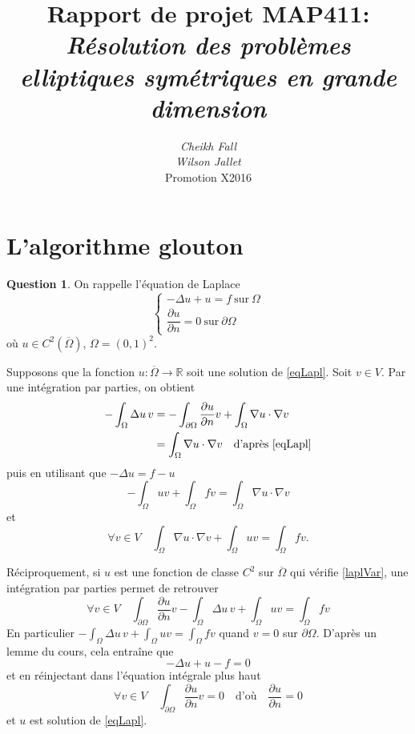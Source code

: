 \documentclass[11pt]{article}
\title{
	\textbf{Rapport de projet MAP411}:\\
	\textit{Résolution des problèmes elliptiques symétriques en grande dimension}}
\author{
	\textit{Cheikh Fall}\\
	\textit{Wilson Jallet}\\
Promotion X2016}
\newcommand{\RR}{\mathbb{R}}
\theoremstyle{definition}
\newtheorem{ques}{Question}
\begin{document}
\maketitle

\section{L'algorithme glouton}

\setlength{\parindent}{1cm}
\setlength{\parskip}{3mm}

\begin{ques}
On rappelle l'équation de Laplace
\begin{equation}\label{eqLapl}
\left\{
\begin{array}{c}
-\Delta u + u = f\ \text{sur}\ \Omega \\
\dfrac{\partial u}{\partial n} = 0\ \text{sur}\ \partial\Omega
\end{array}
\right.
\end{equation}
où $u \in C^2(\overline{\Omega})$, $\Omega = (0,1)^2$.

Supposons que la fonction $u:\overline\Omega\longrightarrow\RR$ soit une solution de \eqref{eqLapl}. Soit $v\in V$. Par une intégration par parties, on obtient
\begin{align*}
-\int_\Omega \Delta u\, v &= -\int_{\partial\Omega} \frac{\partial u}{\partial n}v + \int_\Omega \nabla u\cdot \nabla v \\
&= \int_\Omega \nabla u\cdot \nabla v \quad \text{d'après \eqref{eqLapl}}
\end{align*}
puis en utilisant que $-\Delta u = f-u$
\[
	-\int_\Omega uv + \int_\Omega fv = \int_\Omega \nabla u\cdot \nabla v
\]
et
\begin{equation}\label{laplVar}
\forall v\in V\quad
\int_\Omega \nabla u\cdot \nabla v + \int_\Omega uv = \int_\Omega fv.
\end{equation}


Réciproquement, si $u$ est une fonction de classe $C^2$ sur $\overline\Omega$ qui vérifie \eqref{laplVar}, une intégration par parties permet de retrouver 
\[
\forall v\in V\quad 
\int_{\partial\Omega} \frac{\partial u}{\partial n}v -\int_\Omega \Delta u\, v + \int_\Omega uv = \int_\Omega fv
\]
En particulier $-\int_\Omega \Delta u\,v + \int_\Omega uv = \int_\Omega fv $ quand $v=0$ sur $\partial\Omega$. D'après un lemme du cours, cela entraîne que\[ -\Delta u+ u -f = 0  \]
et en réinjectant dans l'équation intégrale plus haut
\[
\forall v\in V\quad 
\int_{\partial\Omega}\frac{\partial u}{\partial n}v = 0\quad \text{d'où}\quad \frac{\partial u}{\partial n} = 0
\]
et $u$ est solution de \eqref{eqLapl}.

\end{ques}
\end{document}
